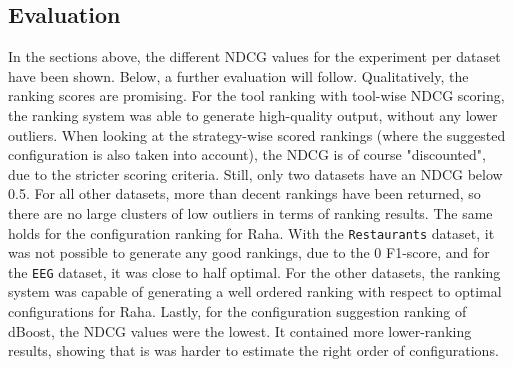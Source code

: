 \subsection{Evaluation}
\label{subsec:results_ranking_evaluation}
In the sections above, the different NDCG values for the experiment per dataset have been shown. Below, a further evaluation will follow.
Qualitatively, the ranking scores are promising. For the tool ranking with tool-wise NDCG scoring, the ranking system was able to generate high-quality output, without any lower outliers. When looking at the strategy-wise scored rankings (where the suggested configuration is also taken into account), the NDCG is of course "discounted", due to the stricter scoring criteria. Still, only two datasets have an NDCG below 0.5. For all other datasets, more than decent rankings have been returned, so there are no large clusters of low outliers in terms of ranking results. The same holds for the configuration ranking for Raha. With the \verb|Restaurants| dataset, it was not possible to generate any good rankings, due to the 0 F1-score, and for the \verb|EEG| dataset, it was close to half optimal. For the other datasets, the ranking system was capable of generating a well ordered ranking with respect to optimal configurations for Raha. Lastly, for the configuration suggestion ranking of dBoost, the NDCG values were the lowest. It contained more lower-ranking results, showing that is was harder to estimate the right order of configurations. 



